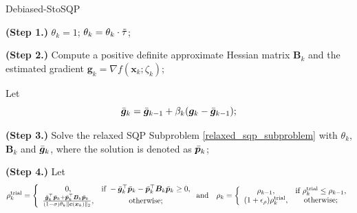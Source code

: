 \documentclass[aos]{imsart}
\numberwithin{equation}{section}
\theoremstyle{plain}
\begin{document}
\begin{algorithm}[htb]
 \caption{Debiased-StoSQP 
         }
 \label{alg_stoch_relaxed_sqp_averaging_grad}
 \begin{algorithmic}[1]
 \renewcommand{\algorithmicrequire}{\textbf{Input:} $\bm{\ell} \leq \bm{x}_0 \leq \bm{u}$, $\tau, \Tilde{\tau} \in (0,1)$, $\sigma \in (0,1)$, $\rho_{-1} >0$, $\epsilon_{\rho}, \epsilon_{\xi}, \beta \in (0,1)$, $\mu \in (0,1)$, $\varrho>0$, $\{\beta_k\}_{k=0}^{\infty}$, $\{\gamma_k\}_{k=0}^{\infty}$.}
 \REQUIRE 
  \STATE \textbf{(Step 1.)} $\theta_k = 1$;
  \STATE $\theta_k = \theta_k \cdot \Tilde{\tau}$;

  \ENDWHILE

  \STATE \textbf{(Step 2.)} Compute a positive definite approximate Hessian matrix $\bm{B}_k$ and the estimated gradient $\bm{g}_k = \nabla f(\bm{x}_k; \zeta_{k})$;

  \STATE Let 
  \begin{equation*}
      \Bar{\bm{g}}_k = \Bar{\bm{g}}_{k-1} + \beta_k (\bm{g}_k - \Bar{\bm{g}}_{k-1});
  \end{equation*}
  
  \STATE \textbf{(Step 3.)} Solve the relaxed SQP Subproblem \eqref{relaxed_sqp_subproblem} with $\theta_k$, $\bm{B}_k$ and $\Bar{\bm{g}}_{k}$, where the solution is denoted as $\Bar{\bm{p}}_k$;

  \STATE \textbf{(Step 4.)} Let \begin{equation}
  \label{stoch_rho_trial}
        \rho_k^{\text{trial}} = \left \{ \begin{array}{cc}
           0,  & \text{if}~ -\Bar{\bm{g}}_k^{\top} \Bar{\bm{p}}_k - \Bar{\bm{p}}_k^{\top} \bm{B}_k \Bar{\bm{p}}_k \geq 0, \\
           \frac{\Bar{\bm{g}}_k^{\top} \Bar{\bm{p}}_k + \Bar{\bm{p}}_k^{\top} \bm{B}_k \Bar{\bm{p}}_k}{(1-\sigma)\theta_k \|\bm{c}(\bm{x}_k)\|_2},  &  \text{otherwise;}
        \end{array}\right. \text{and} \quad 
        \rho_k = \left\{ \begin{array}{cc}
        \rho_{k-1}, &  \text{if}~\rho_{k}^{\text{trial}} \leq \rho_{k-1}, \\
        (1+\epsilon_{\rho})\rho_{k}^{\text{trial}}, & \text{otherwise};
    \end{array} \right.
    \end{equation}
  

\end{algorithmic}
\end{algorithm}
\end{document}
